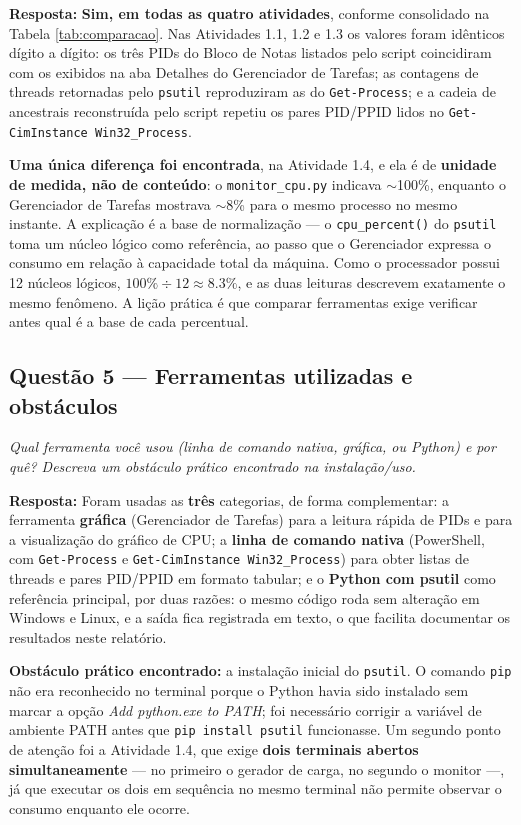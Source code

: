 \documentclass[12pt,a4paper]{article}
\begin{document}
\textbf{Resposta:} \textbf{Sim, em todas as quatro atividades}, conforme consolidado na Tabela \ref{tab:comparacao}. Nas Atividades 1.1, 1.2 e 1.3 os valores foram idênticos dígito a dígito: os três PIDs do Bloco de Notas listados pelo script coincidiram com os exibidos na aba Detalhes do Gerenciador de Tarefas; as contagens de threads retornadas pelo \texttt{psutil} reproduziram as do \texttt{Get-Process}; e a cadeia de ancestrais reconstruída pelo script repetiu os pares PID/PPID lidos no \texttt{Get-CimInstance Win32\_Process}.

\textbf{Uma única diferença foi encontrada}, na Atividade 1.4, e ela é de \textbf{unidade de medida, não de conteúdo}: o \texttt{monitor\_cpu.py} indicava $\sim$100\%, enquanto o Gerenciador de Tarefas mostrava $\sim$8\% para o mesmo processo no mesmo instante. A explicação é a base de normalização — o \texttt{cpu\_percent()} do \texttt{psutil} toma um núcleo lógico como referência, ao passo que o Gerenciador expressa o consumo em relação à capacidade total da máquina. Como o processador possui 12 núcleos lógicos, $100\% \div 12 \approx 8.3\%$, e as duas leituras descrevem exatamente o mesmo fenômeno. A lição prática é que comparar ferramentas exige verificar antes qual é a base de cada percentual.

\subsection{Questão 5 — Ferramentas utilizadas e obstáculos}

\textit{Qual ferramenta você usou (linha de comando nativa, gráfica, ou Python) e por quê? Descreva um obstáculo prático encontrado na instalação/uso.}

\textbf{Resposta:} Foram usadas as \textbf{três} categorias, de forma complementar: a ferramenta \textbf{gráfica} (Gerenciador de Tarefas) para a leitura rápida de PIDs e para a visualização do gráfico de CPU; a \textbf{linha de comando nativa} (PowerShell, com \texttt{Get-Process} e \texttt{Get-CimInstance Win32\_Process}) para obter listas de threads e pares PID/PPID em formato tabular; e o \textbf{Python com psutil} como referência principal, por duas razões: o mesmo código roda sem alteração em Windows e Linux, e a saída fica registrada em texto, o que facilita documentar os resultados neste relatório.

\textbf{Obstáculo prático encontrado:} a instalação inicial do \texttt{psutil}. O comando \texttt{pip} não era reconhecido no terminal porque o Python havia sido instalado sem marcar a opção \textit{Add python.exe to PATH}; foi necessário corrigir a variável de ambiente PATH antes que \texttt{pip install psutil} funcionasse. Um segundo ponto de atenção foi a Atividade 1.4, que exige \textbf{dois terminais abertos simultaneamente} — no primeiro o gerador de carga, no segundo o monitor —, já que executar os dois em sequência no mesmo terminal não permite observar o consumo enquanto ele ocorre.
\end{document}
